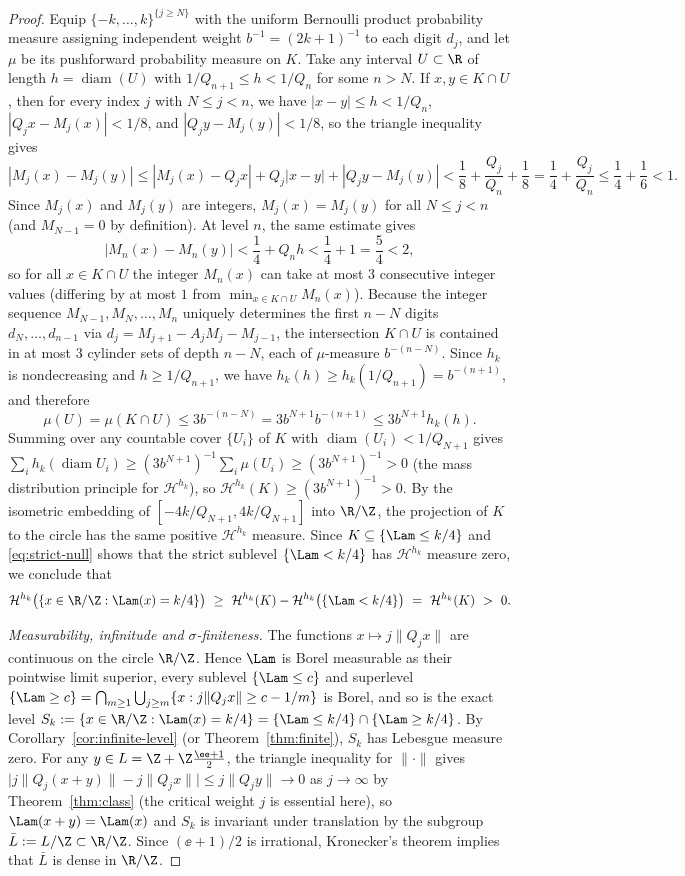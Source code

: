 \begin{proof}
Equip $\{-k,\dots,k\}^{\{j\ge N\}}$ with the uniform Bernoulli product
probability measure assigning independent weight $b^{-1}=(2k+1)^{-1}$ to each
digit $d_j$, and let $\mu$ be its pushforward probability measure on $K$. Take
any interval $U\subset\R$ of length $h=\operatorname{diam}(U)$ with
$1/Q_{n+1}\le h<1/Q_n$ for some $n>N$. If $x,y\in K\cap U$, then for every index
$j$ with $N\le j<n$, we have $|x-y|\le h<1/Q_n$, $|Q_jx-M_j(x)|<1/8$, and
$|Q_jy-M_j(y)|<1/8$, so the triangle inequality gives
\[
|M_j(x)-M_j(y)|
\le|M_j(x)-Q_jx|+Q_j|x-y|+|Q_jy-M_j(y)|
<\frac18+\frac{Q_j}{Q_n}+\frac18=\frac14+\frac{Q_j}{Q_n}\le\frac14+\frac16<1.
\]
Since $M_j(x)$ and $M_j(y)$ are integers, $M_j(x)=M_j(y)$ for all $N\le j<n$
(and $M_{N-1}=0$ by definition). At level $n$, the same estimate gives
\[
|M_n(x)-M_n(y)|<\frac14+Q_n h<\frac14+1=\frac54<2,
\]
so for all $x\in K\cap U$ the integer $M_n(x)$ can take at most $3$ consecutive
integer values (differing by at most $1$ from $\min_{x\in K\cap U}M_n(x)$).
Because the integer sequence $M_{N-1},M_N,\dots,M_n$ uniquely determines the
first $n-N$ digits $d_N,\dots,d_{n-1}$ via $d_j=M_{j+1}-A_jM_j-M_{j-1}$, the
intersection $K\cap U$ is contained in at most $3$ cylinder sets of depth $n-N$,
each of $\mu$-measure $b^{-(n-N)}$. Since $h_k$ is nondecreasing and
$h\ge1/Q_{n+1}$, we have $h_k(h)\ge h_k(1/Q_{n+1})=b^{-(n+1)}$, and therefore
\[
\mu(U)=\mu(K\cap U)\le 3b^{-(n-N)}=3b^{N+1}b^{-(n+1)}\le 3b^{N+1}h_k(h).
\]
Summing over any countable cover $\{U_i\}$ of $K$ with
$\operatorname{diam}(U_i)<1/Q_{N+1}$ gives
$\sum_i h_k(\operatorname{diam}U_i)\ge(3b^{N+1})^{-1}\sum_i\mu(U_i)\ge(3b^{N+1})^{-1}>0$
(the mass distribution principle for $\mathcal H^{h_k}$), so
$\mathcal H^{h_k}(K)\ge(3b^{N+1})^{-1}>0$. By the isometric embedding of
$[-4k/Q_{N+1},4k/Q_{N+1}]$ into $\R/\Z$, the projection of $K$ to the circle has
the same positive $\mathcal H^{h_k}$ measure. Since $K\subseteq\{\Lam\le k/4\}$
and \eqref{eq:strict-null} shows that the strict sublevel $\{\Lam<k/4\}$ has
$\mathcal H^{h_k}$ measure zero, we conclude that
\[
 \mathcal H^{h_k}\bigl(\{x\in\R/\Z:\Lam(x)=k/4\}\bigr)
 \ \ge\ \mathcal H^{h_k}(K)-\mathcal H^{h_k}\bigl(\{\Lam<k/4\}\bigr)
 \ =\ \mathcal H^{h_k}(K)\ >\ 0 .
\]

\emph{Measurability, infinitude and $\sigma$-finiteness.} The functions
$x\mapsto j\|Q_jx\|$ are continuous on the circle $\R/\Z$. Hence $\Lam$ is Borel
measurable as their pointwise limit superior, every sublevel $\{\Lam\le c\}$ and
superlevel $\{\Lam\ge c\}=\bigcap_{m\ge1}\bigcup_{j\ge m}\{x:j\|Q_jx\|\ge c-1/m\}$
is Borel, and so is the exact level
$S_k:=\{x\in\R/\Z:\Lam(x)=k/4\}=\{\Lam\le k/4\}\cap\{\Lam\ge k/4\}$. By
Corollary~\ref{cor:infinite-level} (or Theorem~\ref{thm:finite}), $S_k$ has
Lebesgue measure zero. For any $y\in L=\Z+\Z\frac{\ee+1}{2}$, the triangle
inequality for $\|\cdot\|$ gives
$\bigl|j\|Q_j(x+y)\|-j\|Q_jx\|\bigr|\le j\|Q_jy\|\to0$ as $j\to\infty$ by
Theorem~\ref{thm:class} (the critical weight $j$ is essential here), so
$\Lam(x+y)=\Lam(x)$ and $S_k$ is invariant under translation by the subgroup
$\bar L:=L/\Z\subset\R/\Z$. Since $(\ee+1)/2$ is irrational, Kronecker's theorem
implies that $\bar L$ is dense in $\R/\Z$.


\end{proof}
